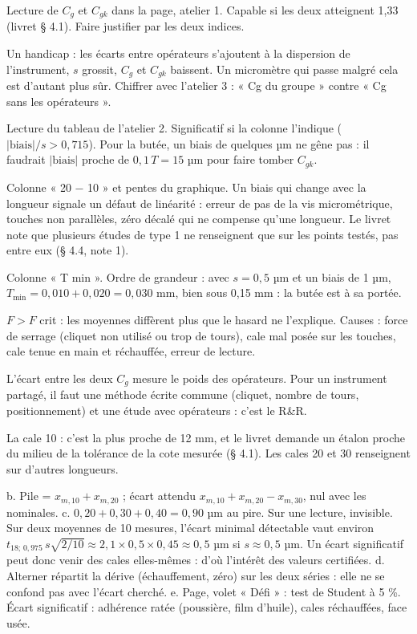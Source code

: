 \documentclass[10pt,a4paper]{article}
\begin{document}
\begin{description}[leftmargin=0pt,style=nextline,itemsep=3pt]
\item[Q1 (fiche stagiaire p. 3)] Lecture de $C_g$ et $C_{gk}$ dans la page, atelier 1. Capable si les deux atteignent 1,33 (livret § 4.1). Faire justifier par les deux indices.
\item[Q2 (p. 3)] Un handicap : les écarts entre opérateurs s'ajoutent à la dispersion de l'instrument, $s$ grossit, $C_g$ et $C_{gk}$ baissent. Un micromètre qui passe malgré cela est d'autant plus sûr. Chiffrer avec l'atelier 3 : « Cg du groupe » contre « Cg sans les opérateurs ».
\item[Q3 (p. 3)] Lecture du tableau de l'atelier 2. Significatif si la colonne l'indique ($\lvert\text{biais}\rvert/s > 0{,}715$). Pour la butée, un biais de quelques µm ne gêne pas : il faudrait $\lvert\text{biais}\rvert$ proche de $0{,}1\,T = 15$ µm pour faire tomber $C_{gk}$.
\item[Q4 (p. 3)] Colonne « 20 − 10 » et pentes du graphique. Un biais qui change avec la longueur signale un défaut de linéarité : erreur de pas de la vis micrométrique, touches non parallèles, zéro décalé qui ne compense qu'une longueur. Le livret note que plusieurs études de type 1 ne renseignent que sur les points testés, pas entre eux (§ 4.4, note 1).
\item[Q5 (p. 3)] Colonne « T min ». Ordre de grandeur : avec $s = 0{,}5$ µm et un biais de 1 µm, $T_{\min} = 0{,}010 + 0{,}020 = 0{,}030$ mm, bien sous 0,15 mm : la butée est à sa portée.
\item[Q6 (p. 3)] $F > F$ crit : les moyennes diffèrent plus que le hasard ne l'explique. Causes : force de serrage (cliquet non utilisé ou trop de tours), cale mal posée sur les touches, cale tenue en main et réchauffée, erreur de lecture.
\item[Q7 (p. 3)] L'écart entre les deux $C_g$ mesure le poids des opérateurs. Pour un instrument partagé, il faut une méthode écrite commune (cliquet, nombre de tours, positionnement) et une étude avec opérateurs : c'est le R\&R.
\item[Q8 (p. 3)] La cale 10 : c'est la plus proche de 12 mm, et le livret demande un étalon proche du milieu de la tolérance de la cote mesurée (§ 4.1). Les cales 20 et 30 renseignent sur d'autres longueurs.
\item[Défi (p. 3)] b. Pile = $x_{m,10} + x_{m,20}$ ; écart attendu $x_{m,10} + x_{m,20} - x_{m,30}$, nul avec les nominales.
c. $0{,}20 + 0{,}30 + 0{,}40 = 0{,}90$ µm au pire. Sur une lecture, invisible. Sur deux moyennes de 10 mesures, l'écart minimal détectable vaut environ $t_{18;\,0{,}975}\, s\sqrt{2/10} \approx 2{,}1 \times 0{,}5 \times 0{,}45 \approx 0{,}5$ µm si $s \approx 0{,}5$ µm. Un écart significatif peut donc venir des cales elles-mêmes : d'où l'intérêt des valeurs certifiées.
d. Alterner répartit la dérive (échauffement, zéro) sur les deux séries : elle ne se confond pas avec l'écart cherché.
e. Page, volet « Défi » : test de Student à 5 \%. Écart significatif : adhérence ratée (poussière, film d'huile), cales réchauffées, face usée.
\end{description}
\end{document}
